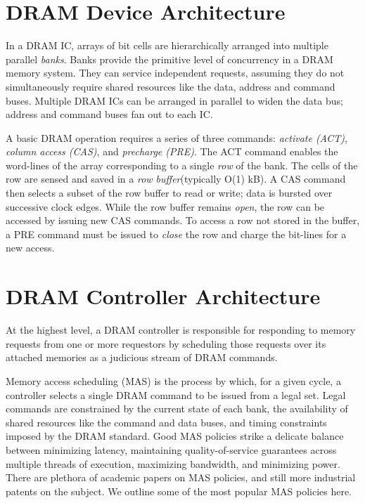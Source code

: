 \section{DRAM Device Architecture}
In a DRAM IC, arrays of bit cells are hierarchically arranged into multiple
parallel \emph{banks}. Banks provide the primitive level of concurrency in a
DRAM memory system. They can service independent requests, assuming they do not
simultaneously require shared resources like the data, address and command
buses.  Multiple DRAM ICs can be arranged in parallel to widen the data bus;
address and command buses fan out to each IC.

A basic DRAM operation requires a series of three commands: \emph{activate
(ACT)}, \emph{column access (CAS)}, and \emph{precharge (PRE)}. The ACT
command enables the word-lines of the array corresponding to a single
\emph{row} of the bank. The cells of the row are sensed and saved in a
\emph{row buffer}(typically O(1) kB). A CAS command then selects a subset of
the row buffer to read or write; data is bursted over successive clock edges.
While the row buffer remains \emph{open}, the row can be accessed by issuing
new CAS commands. To access a row not stored in the buffer, a PRE command must
be issued to \emph{close} the row and charge the bit-lines for a new access.

\section{DRAM Controller Architecture}

At the highest level, a DRAM controller is responsible for responding to memory
requests from one or more requestors by scheduling those requests over its
attached memories as a judicious stream of DRAM commands.

Memory access scheduling (MAS) is the process by which, for a given cycle, a
controller selects a single DRAM command to be issued from a legal set. Legal
commands are constrained by the current state of each bank, the availability
of shared resources like the command and data buses, and timing constraints
imposed by the DRAM standard. Good MAS policies strike a delicate balance
between minimizing latency, maintaining quality-of-service guarantees across
multiple threads of execution, maximizing bandwidth, and minimizing power.
There are plethora of academic papers on MAS policies, and still more
industrial patents on the subject. We outline some of the most popular MAS policies
here.

